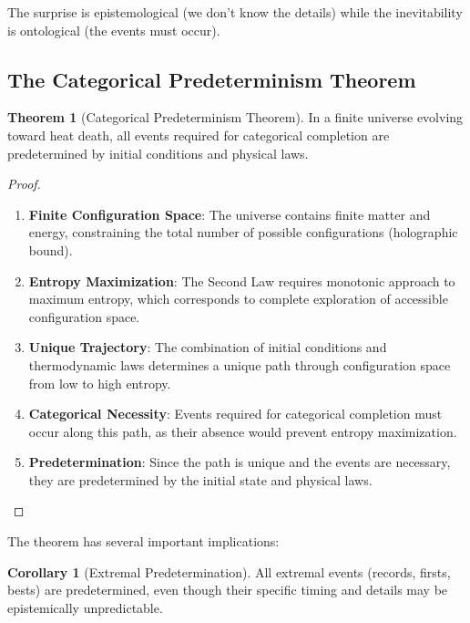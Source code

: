 \documentclass[12pt,a4paper]{article}
\theoremstyle{definition}
\newtheorem{theorem}{Theorem}[section]
\newtheorem{corollary}{Corollary}[section]
\begin{document}
{The surprise is epistemological (we don't know the details) while the inevitability is ontological (the events must occur).

\subsection{The Categorical Predeterminism Theorem}

\begin{theorem}[Categorical Predeterminism Theorem]
In a finite universe evolving toward heat death, all events required for categorical completion are predetermined by initial conditions and physical laws.
\end{theorem}

\begin{proof}
\begin{enumerate}
\item \textbf{Finite Configuration Space}: The universe contains finite matter and energy, constraining the total number of possible configurations (holographic bound).

\item \textbf{Entropy Maximization}: The Second Law requires monotonic approach to maximum entropy, which corresponds to complete exploration of accessible configuration space.

\item \textbf{Unique Trajectory}: The combination of initial conditions and thermodynamic laws determines a unique path through configuration space from low to high entropy.

\item \textbf{Categorical Necessity}: Events required for categorical completion must occur along this path, as their absence would prevent entropy maximization.

\item \textbf{Predetermination}: Since the path is unique and the events are necessary, they are predetermined by the initial state and physical laws.
\end{enumerate}
\end{proof}

The theorem has several important implications:

\begin{corollary}[Extremal Predetermination]
All extremal events (records, firsts, bests) are predetermined, even though their specific timing and details may be epistemically unpredictable.
\end{corollary}

}
\end{document}

